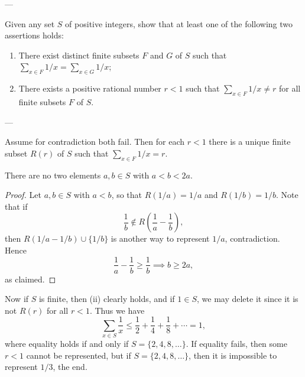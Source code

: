 
---

Given any set $S$ of positive integers, show that at least one of the following two assertions holds:
\begin{enumerate}[label=(\roman*)]
    \item There exist distinct finite subsets $F$ and $G$ of $S$ such that $\sum_{x\in F}1/x=\sum_{x\in G}1/x$;
    \item There exists a positive rational number $r<1$ such that $\sum_{x\in F}1/x\neq r$ for all finite subsets $F$ of $S$.
\end{enumerate}

---

Assume for contradiction both fail. Then for each $r<1$ there is a unique finite subset $R(r)$ of $S$ such that $\textstyle\sum_{x\in F}1/x=r$.
\begin{iclaim*}
    There are no two elements $a,b\in S$ with $a<b<2a$.
\end{iclaim*}
\begin{proof}
    Let $a,b\in S$ with $a<b$, so that $R(1/a)=1/a$ and $R(1/b)=1/b$. Note that if \[\frac1b\notin R\left(\frac1a-\frac1b\right),\]
    then $R(1/a-1/b)\cup\{1/b\}$ is another way to represent $1/a$, contradiction. Hence \[\frac1a-\frac1b\ge\frac1b\implies b\ge2a,\]
    as claimed.
\end{proof}

Now if $S$ is finite, then (ii) clearly holds, and if $1\in S$, we may delete it since it is not $R(r)$ for all $r<1$. Thus we have \[\sum_{x\in S}\frac1x\le\frac12+\frac14+\frac18+\cdots=1,\]
where equality holds if and only if $S=\{2,4,8,\ldots\}$. If equality fails, then some $r<1$ cannot be represented, but if $S=\{2,4,8,\ldots\}$, then it is impossible to represent $1/3$, the end.

